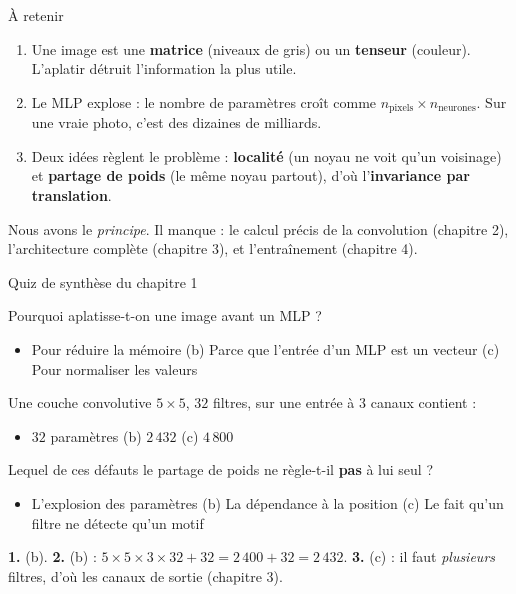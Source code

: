 \begin{frame}{À retenir}
\begin{kbox}
\begin{enumerate}
  \item Une image est une \textbf{matrice} (niveaux de gris) ou un
  \textbf{tenseur} (couleur). L'aplatir détruit l'information la plus utile.
  \item Le MLP explose : le nombre de paramètres croît comme
  $n_{\text{pixels}} \times n_{\text{neurones}}$. Sur une vraie photo, c'est
  des dizaines de milliards.
  \item Deux idées règlent le problème : \textbf{localité} (un noyau ne voit
  qu'un voisinage) et \textbf{partage de poids} (le même noyau partout),
  d'où l'\textbf{invariance par translation}.
\end{enumerate}
\end{kbox}
\vspace{2mm}
\begin{wbox}
Nous avons le \emph{principe}. Il manque : le calcul précis de la convolution
(chapitre 2), l'architecture complète (chapitre 3), et l'entraînement
(chapitre 4).
\end{wbox}
\end{frame}

\begin{frame}{Quiz de synthèse du chapitre 1}
\begin{qbox}[Question 1]
Pourquoi aplatisse-t-on une image avant un MLP ?
\begin{itemize}
  \item[(a)] Pour réduire la mémoire \quad (b) Parce que l'entrée d'un MLP est un
  vecteur \quad (c) Pour normaliser les valeurs
\end{itemize}
\end{qbox}
\begin{qbox}[Question 2]
Une couche convolutive $5 \times 5$, $32$ filtres, sur une entrée à $3$ canaux
contient :
\begin{itemize}
  \item[(a)] $32$ paramètres \quad (b) $2\,432$ \quad (c) $4\,800$
\end{itemize}
\end{qbox}
\begin{qbox}[Question 3]
Lequel de ces défauts le partage de poids ne règle-t-il \textbf{pas} à lui seul ?
\begin{itemize}
  \item[(a)] L'explosion des paramètres \quad (b) La dépendance à la position
  \quad (c) Le fait qu'un filtre ne détecte qu'un motif
\end{itemize}
\end{qbox}
\begin{solbox}[Réponses]
\textbf{1.} (b). \quad
\textbf{2.} (b) : $5 \times 5 \times 3 \times 32 + 32 = 2\,400 + 32 = 2\,432$. \quad
\textbf{3.} (c) : il faut \emph{plusieurs} filtres, d'où les canaux de sortie
(chapitre 3).
\end{solbox}
\end{frame}

